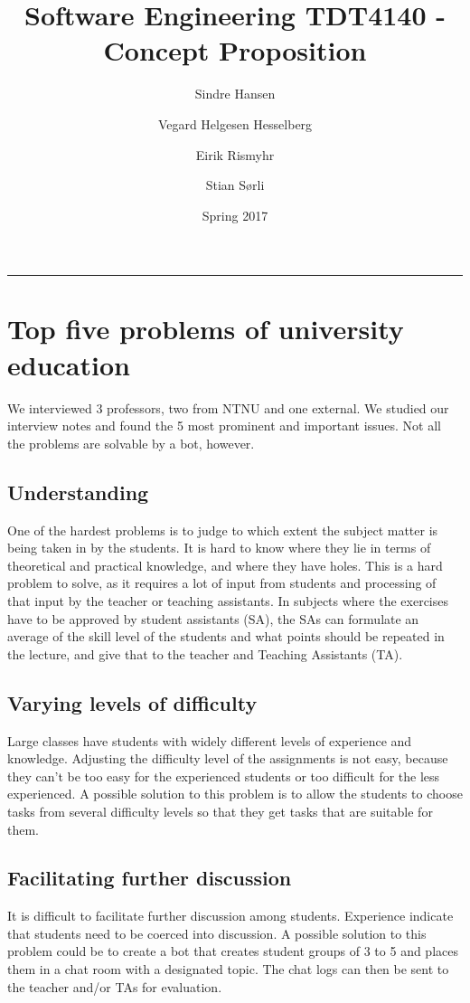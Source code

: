 \documentclass[a4paper]{article}
\title{Software Engineering TDT4140 - Concept Proposition}
\author{Sindre Hansen \and Vegard Helgesen Hesselberg \and Eirik Rismyhr \and Stian Sørli}
\date{Spring 2017}
\begin{document}
\maketitle
\rule{\linewidth}{0.5mm}

\section{Top five problems of university education}
We interviewed 3 professors, two from NTNU and one external. We studied our interview notes and found the 5 most prominent and important issues. Not all the problems are solvable by a bot, however.

\subsection{Understanding}
One of the hardest problems is to judge to which extent the subject matter is being taken in by the students. It is hard to know where they lie in terms of theoretical and practical knowledge, and where they have holes. This is a hard problem to solve, as it requires a lot of input from students and processing of that input by the teacher or teaching assistants. In subjects where the exercises have to be approved by student assistants (SA), the SAs can formulate an average of the skill level of the students and what points should be repeated in the lecture, and give that to the teacher and Teaching Assistants (TA).

\subsection{Varying levels of difficulty}
Large classes have students with widely different levels of experience and knowledge. Adjusting the difficulty level of the assignments is not easy, because they can’t be too easy for the experienced students or too difficult for the less experienced. A possible solution to this problem is to allow the students to choose tasks from several difficulty levels so that they get tasks that are suitable for them.

\subsection{Facilitating further discussion}
It is difficult to facilitate further discussion among students. Experience indicate that students need to be coerced into discussion. A possible solution to this problem could be to create a bot that creates student groups of 3 to 5 and places them in a chat room with a designated topic. The chat logs can then be sent to the teacher and/or TAs for evaluation.
\end{document}
